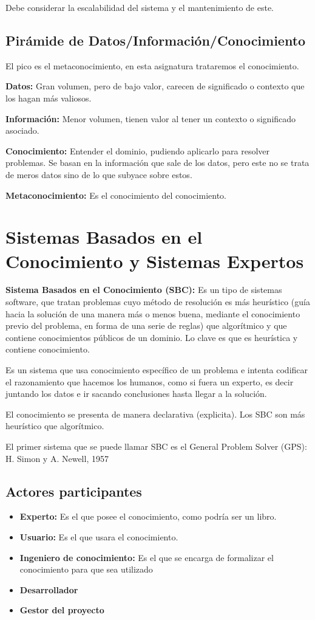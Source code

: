 \documentclass[12pt, twoside, openright]{report} %
\begin{document}
Debe considerar la escalabilidad del sistema y el mantenimiento de este.

\subsection{Pirámide de Datos/Información/Conocimiento}
El pico es el metaconocimiento, en esta asignatura trataremos el conocimiento.

\textbf{Datos:} Gran volumen, pero de bajo valor, carecen de significado o contexto que los hagan más valiosos.

\textbf{Información:} Menor volumen, tienen valor al tener un contexto o significado asociado.

\textbf{Conocimiento:} Entender el dominio, pudiendo aplicarlo para resolver problemas. Se basan en la información que sale de los datos, pero este no se trata de meros datos sino de lo que subyace sobre estos.

\textbf{Metaconocimiento:} Es el conocimiento del conocimiento.

\section{Sistemas Basados en el Conocimiento y Sistemas Expertos}

\textbf{Sistema Basados en el Conocimiento (SBC):} Es un tipo de sistemas software, que tratan problemas cuyo método de resolución es más heurístico (guía hacia la solución de una manera más o menos buena, mediante el conocimiento previo del problema, en forma de una serie de reglas) que algorítmico y que contiene conocimientos públicos de un dominio. Lo clave es que es heurística y contiene conocimiento.

Es un sistema que usa conocimiento específico de un problema e intenta codificar el razonamiento que hacemos los humanos, como si fuera un experto, es decir juntando los datos e ir sacando conclusiones hasta llegar a la solución.

El conocimiento se presenta de manera declarativa (explicita). Los SBC son más heurístico que algorítmico.

El primer sistema que se puede llamar SBC es el General Problem Solver (GPS): H. Simon y A. Newell, 1957

\subsection{Actores participantes}
\begin{itemize}
	\item \textbf{Experto:} Es el que posee el conocimiento, como podría ser un libro.
	\item \textbf{Usuario:} Es el que usara el conocimiento.
	\item \textbf{Ingeniero de conocimiento:} Es el que se encarga de formalizar el conocimiento para que sea utilizado \item \textbf{Desarrollador}
	\item \textbf{Gestor del proyecto}
\end{itemize}
\end{document}
